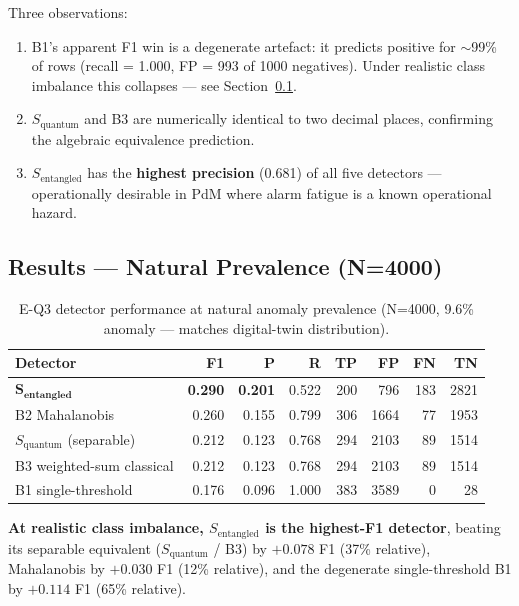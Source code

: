 Three observations:
\begin{enumerate}
    \item B1's apparent F1 win is a degenerate artefact: it predicts positive for $\sim$99\% of rows (recall = 1.000, FP = 993 of 1000 negatives). Under realistic class imbalance this collapses --- see Section~\ref{sec:eq3_natural}.
    \item $S_{\text{quantum}}$ and B3 are numerically identical to two decimal places, confirming the algebraic equivalence prediction.
    \item $S_{\text{entangled}}$ has the \textbf{highest precision} (0.681) of all five detectors --- operationally desirable in PdM where alarm fatigue is a known operational hazard.
\end{enumerate}

\subsection{Results --- Natural Prevalence (N=4000)}
\label{sec:eq3_natural}

\begin{table}[h!]
\centering
\caption{E-Q3 detector performance at natural anomaly prevalence (N=4000, 9.6\% anomaly --- matches digital-twin distribution).}
\label{tab:eq3_natural}
\begin{tabular}{lrrrrrrr}
\hline
\textbf{Detector} & \textbf{F1} & \textbf{P} & \textbf{R} & \textbf{TP} & \textbf{FP} & \textbf{FN} & \textbf{TN} \\
\hline
$\boldsymbol{S_{\text{entangled}}}$ & \textbf{0.290} & \textbf{0.201} & 0.522 & 200 &  796 & 183 & 2821 \\
B2 Mahalanobis            & 0.260 & 0.155 & 0.799 & 306 & 1664 &  77 & 1953 \\
$S_{\text{quantum}}$ (separable) & 0.212 & 0.123 & 0.768 & 294 & 2103 &  89 & 1514 \\
B3 weighted-sum classical & 0.212 & 0.123 & 0.768 & 294 & 2103 &  89 & 1514 \\
B1 single-threshold       & 0.176 & 0.096 & 1.000 & 383 & 3589 &   0 &   28 \\
\hline
\end{tabular}
\end{table}

\textbf{At realistic class imbalance, $S_{\text{entangled}}$ is the highest-F1 detector}, beating its separable equivalent ($S_{\text{quantum}}$ / B3) by $+0.078$ F1 (37\% relative), Mahalanobis by $+0.030$ F1 (12\% relative), and the degenerate single-threshold B1 by $+0.114$ F1 (65\% relative).

